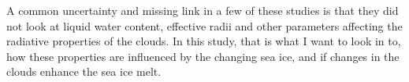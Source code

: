 A common uncertainty and missing link in a few of these studies is that they did not look at liquid water content, effective radii and other parameters affecting the radiative properties of the clouds. In this study, that is what I want to look in to, how these properties are influenced by the changing sea ice, and if changes in the clouds enhance the sea ice melt.





